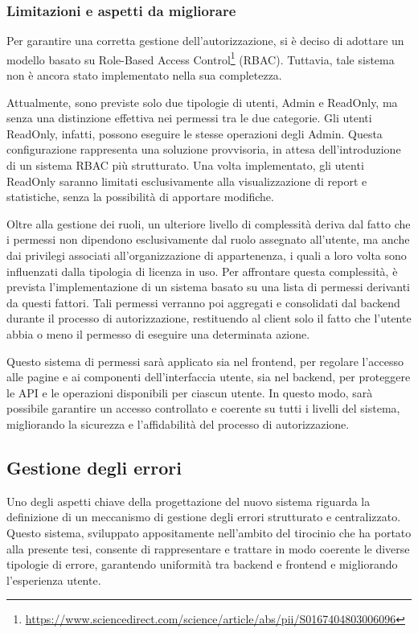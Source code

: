 \subsubsection{Limitazioni e aspetti da migliorare}
Per garantire una corretta gestione dell'autorizzazione, si è deciso di adottare un modello basato su Role-Based Access Control\footnote{\url{https://www.sciencedirect.com/science/article/abs/pii/S0167404803006096}} (RBAC). Tuttavia, tale sistema non è ancora stato implementato nella sua completezza.

Attualmente, sono previste solo due tipologie di utenti, Admin e ReadOnly, ma senza una distinzione effettiva nei permessi tra le due categorie. Gli utenti ReadOnly, infatti, possono eseguire le stesse operazioni degli Admin. Questa configurazione rappresenta una soluzione provvisoria, in attesa dell'introduzione di un sistema RBAC più strutturato. Una volta implementato, gli utenti ReadOnly saranno limitati esclusivamente alla visualizzazione di report e statistiche, senza la possibilità di apportare modifiche.

Oltre alla gestione dei ruoli, un ulteriore livello di complessità deriva dal fatto che i permessi non dipendono esclusivamente dal ruolo assegnato all'utente, ma anche dai privilegi associati all’organizzazione di appartenenza, i quali a loro volta sono influenzati dalla tipologia di licenza in uso. Per affrontare questa complessità, è prevista l'implementazione di un sistema basato su una lista di permessi derivanti da questi fattori. Tali permessi verranno poi aggregati e consolidati dal backend durante il processo di autorizzazione, restituendo al client solo il fatto che l'utente abbia o meno il permesso di eseguire una determinata azione.

Questo sistema di permessi sarà applicato sia nel frontend, per regolare l'accesso alle pagine e ai componenti dell'interfaccia utente, sia nel backend, per proteggere le API e le operazioni disponibili per ciascun utente. In questo modo, sarà possibile garantire un accesso controllato e coerente su tutti i livelli del sistema, migliorando la sicurezza e l’affidabilità del processo di autorizzazione.

\subsection{Gestione degli errori}\label{sec:error-management}
Uno degli aspetti chiave della progettazione del nuovo sistema riguarda la definizione di un meccanismo di gestione degli errori strutturato e centralizzato. Questo sistema, sviluppato appositamente nell’ambito del tirocinio che ha portato alla presente tesi, consente di rappresentare e trattare in modo coerente le diverse tipologie di errore, garantendo uniformità tra backend e frontend e migliorando l’esperienza utente.

